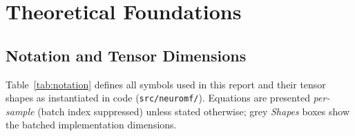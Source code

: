 \documentclass[11pt,a4paper]{article}
\newcommand{\code}[1]{\texttt{#1}}
\begin{document}
\section{Theoretical Foundations}
\label{sec:theory}

\subsection{Notation and Tensor Dimensions}
\label{sec:notation}

Table~\ref{tab:notation} defines all symbols used in this report and their
tensor shapes as instantiated in code (\code{src/neuromf/}).  Equations are
presented \emph{per-sample} (batch index suppressed) unless stated otherwise;
grey \emph{Shapes} boxes show the batched implementation dimensions.
\end{document}
